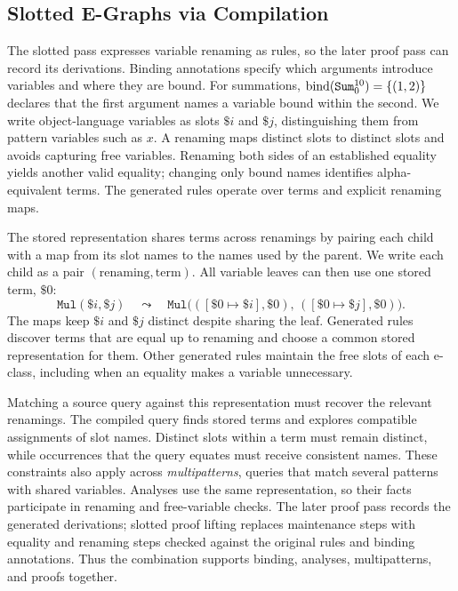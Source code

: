 \subsection{Slotted E-Graphs via Compilation}
\label{sec:slotted-compilation}

The slotted pass expresses variable renaming as rules,
  so the later proof pass can record its derivations.
Binding annotations specify which arguments introduce variables and where they are bound.
For summations, $\operatorname{bind}(\mathtt{Sum}_{0}^{10})=\{(1,2)\}$ declares that the first argument
  names a variable bound within the second.
We write object-language variables as slots $\$i$ and $\$j$,
  distinguishing them from pattern variables such as $x$.
A renaming maps distinct slots to distinct slots and avoids capturing free variables.
Renaming both sides of an established equality yields another valid equality;
  changing only bound names identifies alpha-equivalent terms.
The generated rules operate over terms and explicit renaming maps.

The stored representation shares terms across renamings by pairing each child
  with a map from its slot names to the names used by the parent.
We write each child as a pair $(\text{renaming},\text{term})$.
All variable leaves can then use one stored term, $\$0$:
\[
  \mathtt{Mul}(\$i,\$j)
  \quad\leadsto\quad
  \mathtt{Mul}\bigl(([\$0\mapsto\$i],\$0),\,
                     ([\$0\mapsto\$j],\$0)\bigr).
\]
The maps keep $\$i$ and $\$j$ distinct despite sharing the leaf.
Generated rules discover terms that are equal up to renaming
  and choose a common stored representation for them.
Other generated rules maintain the free slots of each e-class,
  including when an equality makes a variable unnecessary.

Matching a source query against this representation must recover the relevant renamings.
The compiled query finds stored terms and explores compatible assignments of slot names.
Distinct slots within a term must remain distinct,
  while occurrences that the query equates must receive consistent names.
These constraints also apply across \emph{multipatterns},
  queries that match several patterns with shared variables.
Analyses use the same representation, so their facts participate in renaming
  and free-variable checks.
The later proof pass records the generated derivations;
  slotted proof lifting replaces maintenance steps with equality and renaming steps
  checked against the original rules and binding annotations.
Thus the combination supports binding, analyses, multipatterns, and proofs together.

